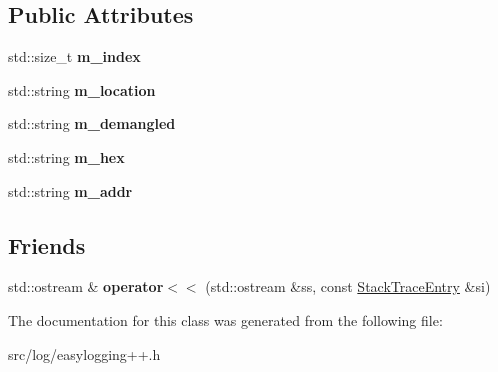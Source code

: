 \subsection*{Public Attributes}
\begin{DoxyCompactItemize}
\item 
std\+::size\+\_\+t {\bfseries m\+\_\+index}\hypertarget{classel_1_1base_1_1debug_1_1StackTrace_1_1StackTraceEntry_a8361364e2cbb728a2e2a17db8b308842}{}\label{classel_1_1base_1_1debug_1_1StackTrace_1_1StackTraceEntry_a8361364e2cbb728a2e2a17db8b308842}

\item 
std\+::string {\bfseries m\+\_\+location}\hypertarget{classel_1_1base_1_1debug_1_1StackTrace_1_1StackTraceEntry_aaf6f6c49736d5c10b2047dde6eef4a38}{}\label{classel_1_1base_1_1debug_1_1StackTrace_1_1StackTraceEntry_aaf6f6c49736d5c10b2047dde6eef4a38}

\item 
std\+::string {\bfseries m\+\_\+demangled}\hypertarget{classel_1_1base_1_1debug_1_1StackTrace_1_1StackTraceEntry_a7ca2c3d08ea6fbef5b605041500c7d47}{}\label{classel_1_1base_1_1debug_1_1StackTrace_1_1StackTraceEntry_a7ca2c3d08ea6fbef5b605041500c7d47}

\item 
std\+::string {\bfseries m\+\_\+hex}\hypertarget{classel_1_1base_1_1debug_1_1StackTrace_1_1StackTraceEntry_af4d5ffabfe8bbffb5eedcdd95b4eebfe}{}\label{classel_1_1base_1_1debug_1_1StackTrace_1_1StackTraceEntry_af4d5ffabfe8bbffb5eedcdd95b4eebfe}

\item 
std\+::string {\bfseries m\+\_\+addr}\hypertarget{classel_1_1base_1_1debug_1_1StackTrace_1_1StackTraceEntry_a11b23a57f14add4b825d97bb1d58e6f2}{}\label{classel_1_1base_1_1debug_1_1StackTrace_1_1StackTraceEntry_a11b23a57f14add4b825d97bb1d58e6f2}

\end{DoxyCompactItemize}
\subsection*{Friends}
\begin{DoxyCompactItemize}
\item 
std\+::ostream \& {\bfseries operator$<$$<$} (std\+::ostream \&ss, const \hyperlink{classel_1_1base_1_1debug_1_1StackTrace_1_1StackTraceEntry}{Stack\+Trace\+Entry} \&si)\hypertarget{classel_1_1base_1_1debug_1_1StackTrace_1_1StackTraceEntry_ae393cfa1f102a32239d485892c659862}{}\label{classel_1_1base_1_1debug_1_1StackTrace_1_1StackTraceEntry_ae393cfa1f102a32239d485892c659862}

\end{DoxyCompactItemize}


The documentation for this class was generated from the following file\+:\begin{DoxyCompactItemize}
\item 
src/log/easylogging++.\+h\end{DoxyCompactItemize}
